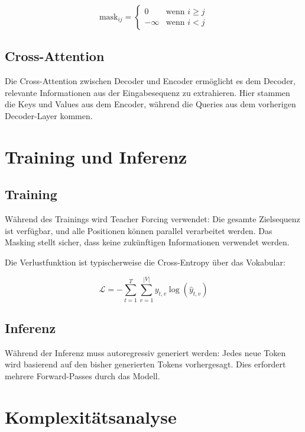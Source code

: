 \begin{equation}
\text{mask}_{ij} = \begin{cases}
0 & \text{wenn } i \geq j \\
-\infty & \text{wenn } i < j
\end{cases}
\end{equation}

\subsection{Cross-Attention}

Die Cross-Attention zwischen Decoder und Encoder ermöglicht es dem Decoder, relevante Informationen aus der Eingabesequenz zu extrahieren. Hier stammen die Keys und Values aus dem Encoder, während die Queries aus dem vorherigen Decoder-Layer kommen.

\section{Training und Inferenz}

\subsection{Training}

Während des Trainings wird Teacher Forcing verwendet: Die gesamte Zielsequenz ist verfügbar, und alle Positionen können parallel verarbeitet werden. Das Masking stellt sicher, dass keine zukünftigen Informationen verwendet werden.

Die Verlustfunktion ist typischerweise die Cross-Entropy über das Vokabular:

\begin{equation}
\mathcal{L} = -\sum_{t=1}^{T} \sum_{v=1}^{|V|} y_{t,v} \log(\hat{y}_{t,v})
\end{equation}

\subsection{Inferenz}

Während der Inferenz muss autoregressiv generiert werden: Jedes neue Token wird basierend auf den bisher generierten Tokens vorhergesagt. Dies erfordert mehrere Forward-Passes durch das Modell.

\section{Komplexitätsanalyse}

